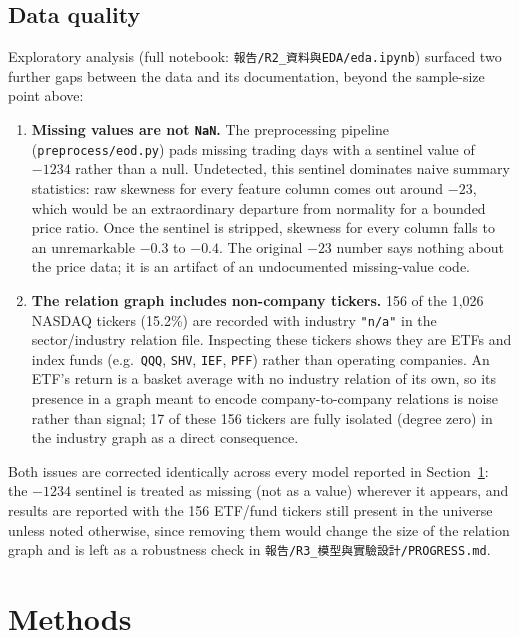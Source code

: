 \documentclass[11pt]{article}
\begin{document}
\subsection{Data quality}

Exploratory analysis (full notebook: \texttt{報告/R2\_資料與EDA/eda.ipynb}) surfaced two further
gaps between the data and its documentation, beyond the sample-size point above:

\begin{enumerate}
  \item \textbf{Missing values are not \texttt{NaN}.} The preprocessing pipeline
  (\texttt{preprocess/eod.py}) pads missing trading days with a sentinel value of $-1234$ rather
  than a null. Undetected, this sentinel dominates naive summary statistics: raw skewness for
  every feature column comes out around $-23$, which would be an extraordinary departure from
  normality for a bounded price ratio. Once the sentinel is stripped, skewness for every column
  falls to an unremarkable $-0.3$ to $-0.4$. The original $-23$ number says nothing about the
  price data; it is an artifact of an undocumented missing-value code.
  \item \textbf{The relation graph includes non-company tickers.} 156 of the 1{,}026 NASDAQ
  tickers (15.2\%) are recorded with industry \texttt{"n/a"} in the sector/industry relation file.
  Inspecting these tickers shows they are ETFs and index funds (e.g.\ \texttt{QQQ}, \texttt{SHV},
  \texttt{IEF}, \texttt{PFF}) rather than operating companies. An ETF's return is a basket average
  with no industry relation of its own, so its presence in a graph meant to encode
  company-to-company relations is noise rather than signal; 17 of these 156 tickers are fully
  isolated (degree zero) in the industry graph as a direct consequence.
\end{enumerate}

Both issues are corrected identically across every model reported in Section~\ref{sec:methods}:
the $-1234$ sentinel is treated as missing (not as a value) wherever it appears, and results are
reported with the 156 ETF/fund tickers still present in the universe unless noted otherwise, since
removing them would change the size of the relation graph and is left as a robustness check in
\texttt{報告/R3\_模型與實驗設計/PROGRESS.md}.

\section{Methods}
\label{sec:methods}
\end{document}
